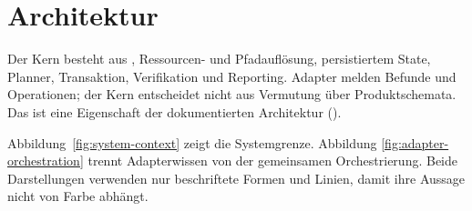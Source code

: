 \section{Architektur}
\label{chap:architecture}

Der Kern besteht aus \ProjectContext{}, Ressourcen- und Pfadauflösung, persistiertem
State, Planner, Transaktion, Verifikation und Reporting. Adapter melden Befunde und
Operationen; der Kern entscheidet nicht aus Vermutung über Produktschemata. Das ist eine
\Implemented{} Eigenschaft der dokumentierten Architektur
().

Abbildung~\ref{fig:system-context} zeigt die Systemgrenze. Abbildung
\ref{fig:adapter-orchestration} trennt Adapterwissen von der gemeinsamen
Orchestrierung. Beide Darstellungen verwenden nur beschriftete Formen und Linien, damit
ihre Aussage nicht von Farbe abhängt.
